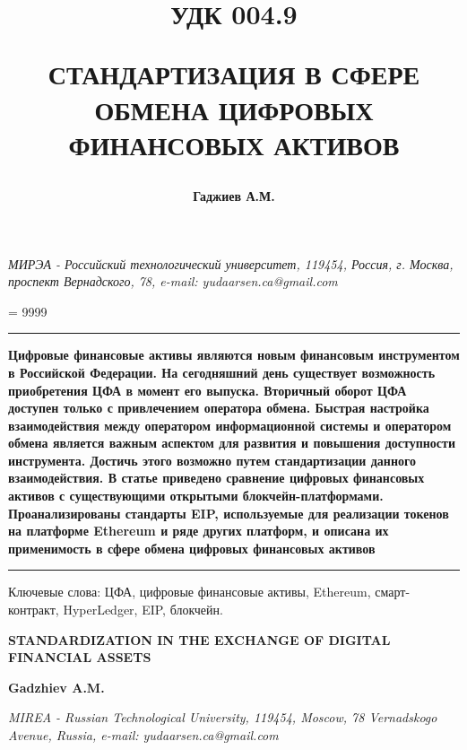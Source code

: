 \documentclass[a4paper, 10pt]{article}
\title{ 
	\begin{flushleft}
		\begin{spacing}{1.25}
		 	\fontsize{14pt}{20pt}\selectfont УДК 004.9
		\end{spacing}
	\end{flushleft}  
	\textbf{
			\fontsize{14pt}{0pt}\selectfont	СТАНДАРТИЗАЦИЯ В СФЕРЕ ОБМЕНА ЦИФРОВЫХ ФИНАНСОВЫХ АКТИВОВ
		}
	}
\author{\textbf{Гаджиев А.М.}}
\date{}
\begin{document}
	
	\maketitle
	\leftskip 0.5cm
	\begin{raggedleft}
	 \textit{МИРЭА - Российский технологический университет, 119454, Россия, г. Москва, проспект Вернадского, 78, e-mail: yudaarsen.ca@gmail.com
	 }
	\end{raggedleft}
	
	\justifying
	\tolerance = 9999
	\leftskip 0cm
	
	\vspace{3pt}
	\hrule height 2pt
	\vspace{3pt}
	
	\noindent \textbf{Цифровые финансовые активы являются новым финансовым инструментом в Российской Федерации. На сегодняшний день существует возможность приобретения ЦФА в момент его выпуска. Вторичный оборот ЦФА доступен только с привлечением оператора обмена. Быстрая настройка взаимодействия между оператором информационной системы и оператором обмена является важным аспектом для развития и повышения доступности инструмента. Достичь этого возможно путем стандартизации данного взаимодействия. В статье приведено сравнение цифровых финансовых активов с существующими открытыми блокчейн-платформами. Проанализированы стандарты EIP, используемые для реализации токенов на платформе Ethereum и ряде других платформ, и описана их применимость в сфере обмена цифровых финансовых активов}
	
	\vspace{3pt}
	\hrule height 2pt
	\vspace{6pt}
	
	\noindent Ключевые слова: ЦФА, цифровые финансовые активы, Ethereum, смарт-контракт, HyperLedger, EIP, блокчейн.
	
	\begin{center}
		\begin{spacing}{1.5}
			\textbf{\fontsize{14pt}{0}\selectfont STANDARDIZATION IN THE EXCHANGE OF DIGITAL FINANCIAL ASSETS}
		\end{spacing}
		\vspace{\baselineskip}
		\textbf{\fontsize{14pt}{0}\selectfont Gadzhiev A.M.}
	\end{center}
	
	\leftskip 0.5cm
	\begin{raggedleft}
		\textit{MIREA - Russian Technological University, 119454, Moscow, 78 Vernadskogo Avenue, Russia, e-mail: yudaarsen.ca@gmail.com}
	\end{raggedleft}
	
\end{document}

